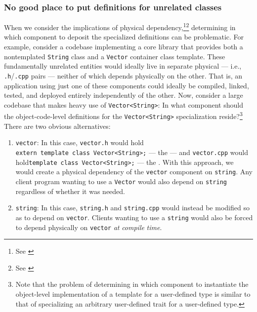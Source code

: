 \subsubsection[No good place to put definitions for unrelated classes]{No good place to put definitions for unrelated classes}\label{no-good-place-to-put-definitions-for-unrelated-classes}

When we consider the implications of physical
dependency,\footnote{See \cite{lakos96}}\footnote{See \cite{lakos20}} determining in which component to deposit the
specialized definitions can be problematic. For example, consider a
codebase implementing a core library that provides both a nontemplated
\lstinline!String! class and a \lstinline!Vector! container class template.
These fundamentally unrelated entities would ideally live in separate
physical  --- i.e., \lstinline!.h!/\lstinline!.cpp! pairs
--- neither of which depends physically on the other. That is, an
application using just one of these components could ideally be
compiled, linked, tested, and deployed entirely independently of the
other. Now, consider a large codebase that makes heavy use of
\lstinline!Vector<String>!: In what component should the object-code-level
definitions for the \lstinline!Vector<String>! specialization
reside?{\cprotect\footnote{Note that the problem of determining in which
component to instantiate the object-level implementation of a template
for a user-defined type is similar to that of specializing an
  arbitrary user-defined trait for a user-defined type.}} There are two
obvious alternatives:
\begin{enumerate}
\item{\lstinline!vector!: In this case, \lstinline!vector.h! would hold  \lstinline!extern!~\lstinline!template!~\lstinline!class!~\lstinline!Vector<String>;! --- the  --- and \lstinline!vector.cpp! would hold\linebreak[4]%
\lstinline!template!~\lstinline!class!~\lstinline!Vector<String>;! --- the . With this approach, we would create a physical dependency of the \lstinline!vector! component on \lstinline!string!. Any client program wanting to use a \lstinline!Vector! would also depend on \lstinline!string! regardless of whether it was needed.}
\item{\lstinline!string!: In this case, \lstinline!string.h! and \lstinline!string.cpp! would instead be modified so as to depend on \lstinline!vector!. Clients wanting to use a \lstinline!string! would also be forced to depend physically on \lstinline!vector! \emph{at} \emph{compile} \emph{time}.}
\end{enumerate}
